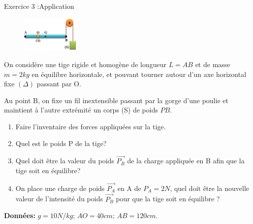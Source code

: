 \documentclass[12pt, french]{article}
\begin{document}
\begin{Box2}{Exercice 3 :Application  }
	\begin{figure}
  \begin{center}
	\includegraphics[width=0.25\textwidth]{./img/ex02.png}
  \end{center}
\end{figure}

On considère une tige rigide et homogène de longueur $L = AB$ et
de masse $m = 2kg$ en équilibre horizontale, et pouvant tourner
autour d'un axe horizontal fixe $(\Delta)$ passant par O.

Au point B, on fixe un fil inextensible passant par la gorge d’une
poulie et \\maintient à l'autre extrémité un corps (S) de poids $PB$.

\begin{enumerate}
	\item  Faire l’inventaire des forces appliquées sur la tige.
	\item  Quel est le poids P de la tige?
	\item  Quel doit être la valeur du poids $\vec{P_B}$ de la charge appliquée en B afin que la tige soit en équilibre?

	\item  On place une charge de poids $\vec{P_A}$ en A de $P_A = 2N$, quel doit être la nouvelle valeur de l'intensité du
 poids $\vec{P_B}$ pour que la tige soit en équilibre ?

\end{enumerate}

\textbf{Données: } $g = 10N/kg$; $AO = 40cm$; $AB = 120cm$.




\end{Box2}
\end{document}
